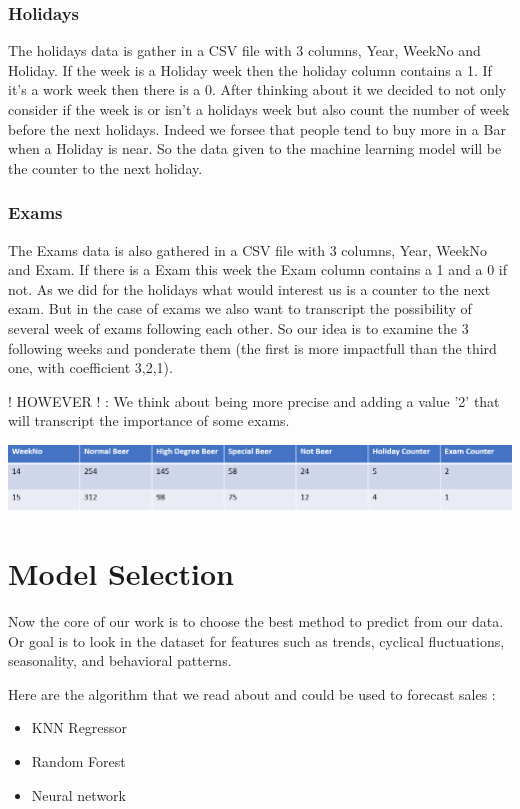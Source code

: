 \documentclass{report}
\begin{document}
\subsection{Holidays}

The holidays data is gather in a CSV file with 3 columns, Year, WeekNo and Holiday. If the week is a Holiday week then the holiday column contains a 1. If it's a work week then there is a 0. After thinking about it we decided to not only consider if the week is or isn't a holidays week but also count the number of week before the next holidays. Indeed we forsee that people tend to buy more in a Bar when a Holiday is near.
So the data given to the machine learning model will be the counter to the next holiday.

\subsection{Exams}

The Exams data is also gathered in a CSV file with 3 columns, Year, WeekNo and Exam. If there is a Exam this week the Exam column contains a 1 and a 0 if not. As we did for the holidays what would interest us is a counter to the next exam. But in the case of exams we also want to transcript the possibility of several week of exams following each other. So our idea is to examine the 3 following weeks and ponderate them (the first is more impactfull than the third one, with coefficient 3,2,1). 


! HOWEVER ! : We think about being more precise and adding a value '2' that will transcript the importance of some exams.



\includegraphics[scale=0.7]{DataModel}
\chapter{Model Selection}

Now the core of our work is to choose the best method to predict from our data. Or goal is to look in the dataset for features such as trends, cyclical fluctuations, seasonality, and behavioral patterns.


Here are the algorithm that we read about and could be used to forecast sales :
\begin{itemize}
\item KNN Regressor
\item Random Forest
\item Neural network
\end{itemize}
\end{document}
